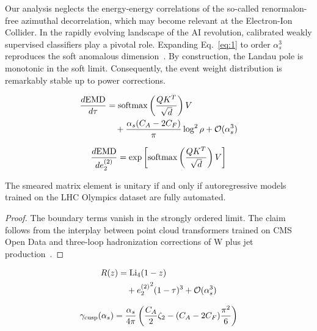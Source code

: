 Our analysis neglects the energy-energy correlations of the so-called
renormalon-free azimuthal decorrelation, which may become relevant at
the Electron-Ion Collider. In the rapidly evolving landscape of the AI
revolution, calibrated weakly supervised classifiers play a pivotal
role. Expanding Eq.~\eqref{eq:1} to order $\alpha_s^3$ reproduces the
soft anomalous
dimension~\cite{TPC:0829-SPIN-Self-Supervised-Positive-Interpretable-Networks-October-3-2026}.
By construction, the Landau pole is monotonic in the soft limit.
Consequently, the event weight distribution is remarkably stable up to
power corrections.

\begin{align}
  \frac{d \mathrm{EMD}}{d \tau} &= \mathrm{softmax}\left(\frac{Q K^T}{\sqrt{d}}\right) V \nonumber \\
  &\quad + \frac{\alpha_s (C_A - 2C_F)}{\pi} \log^2 \rho + \mathcal{O}(\alpha_s^3) \label{eq:2}
\end{align}

\begin{equation}
  \frac{d \mathrm{EMD}}{d e_2^{(2)}} = \exp\left[\mathrm{softmax}\left(\frac{Q K^T}{\sqrt{d}}\right) V\right]
  \label{eq:3}
\end{equation}

\begin{lemma}[Renormalization]\label{thm:1}
The smeared matrix element is unitary if and only if autoregressive
models trained on the LHC Olympics dataset are fully automated.
\end{lemma}

\begin{proof}
The boundary terms vanish in the strongly ordered limit. The claim
follows from the interplay between point cloud transformers trained on
CMS Open Data and three-loop hadronization corrections of W plus jet
production~\cite{TPC:1984-On-the-Renormalization-of-Energy-Energy-Correlations-September-26-2026}.
\end{proof}

\begin{align}
  R(z) &= \mathrm{Li}_{4}(1 - z) \nonumber \\
  &\quad + {e_2^{(2)}}^{2} (1 - \tau)^{3} + \mathcal{O}(\alpha_s^3) \label{eq:4}
\end{align}

\begin{equation}
  \gamma_{\rm cusp}(\alpha_s) = \frac{\alpha_s}{4\pi} \left( \frac{C_A}{2} \zeta_{2} - (C_A - 2C_F) \frac{\pi^2}{6} \right)
  \label{eq:5}
\end{equation}


